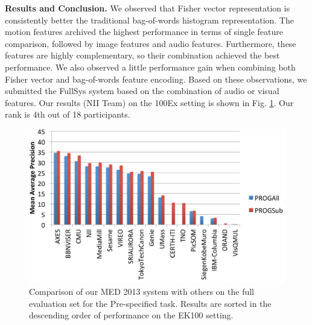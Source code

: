 \textbf{Results and Conclusion.} We observed that Fisher vector representation is consistently better the traditional bag-of-words histogram representation. The motion features archived the highest performance in terms of single feature comparison, followed by image features and audio features. Furthermore, these features are highly complementary, so their combination achieved the best performance. We also observed a little performance gain when combining both Fisher vector and bag-of-words feature encoding. Based on these observations, we submitted the FullSys system based on the combination of audio or visual features. Our results (NII Team) on the 100Ex setting is shown in Fig. \ref{med2013_result}. Our rank is 4th out of 18 participants.

\begin{figure}
	\centering
	\includegraphics[width=1\textwidth]{results.pdf}
	\caption{Comparison of our MED 2013 system with others on the full evaluation set for the Pre-specified task. Results are sorted in the descending order of performance on the EK100 setting.}
	\label{med2013_result}
\end{figure} 